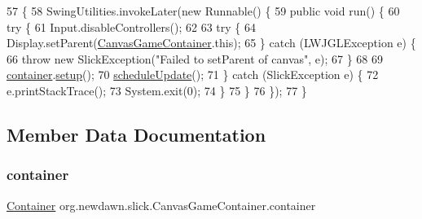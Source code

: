 \begin{DoxyCode}
57                                               \{
58         SwingUtilities.invokeLater(\textcolor{keyword}{new} Runnable() \{
59             \textcolor{keyword}{public} \textcolor{keywordtype}{void} run() \{
60                 \textcolor{keywordflow}{try} \{
61                     Input.disableControllers();
62                     
63                     \textcolor{keywordflow}{try} \{
64                         Display.setParent(\mbox{\hyperlink{classorg_1_1newdawn_1_1slick_1_1_canvas_game_container_a078feee2c69d77cabd1f09b87d055923}{CanvasGameContainer}}.this);
65                     \} \textcolor{keywordflow}{catch} (LWJGLException e) \{
66                         \textcolor{keywordflow}{throw} \textcolor{keyword}{new} SlickException(\textcolor{stringliteral}{"Failed to setParent of canvas"}, e);
67                     \}
68                     
69                     \mbox{\hyperlink{classorg_1_1newdawn_1_1slick_1_1_canvas_game_container_af13c765d7302dc5948d0261e2526ef8b}{container}}.\mbox{\hyperlink{classorg_1_1newdawn_1_1slick_1_1_app_game_container_ac2c97110363892113b435cc8aa5b0d4a}{setup}}();
70                     \mbox{\hyperlink{classorg_1_1newdawn_1_1slick_1_1_canvas_game_container_a38f91f490299ca036d075779ff15ff15}{scheduleUpdate}}();
71                 \} \textcolor{keywordflow}{catch} (SlickException e) \{
72                     e.printStackTrace();
73                     System.exit(0);
74                 \}
75             \}
76         \});
77     \}
\end{DoxyCode}


\subsection{Member Data Documentation}
\mbox{\label{classorg_1_1newdawn_1_1slick_1_1_canvas_game_container_af13c765d7302dc5948d0261e2526ef8b}} 
\subsubsection{\texorpdfstring{container}{container}}
{\footnotesize\ttfamily \mbox{\hyperlink{classorg_1_1newdawn_1_1slick_1_1_canvas_game_container_1_1_container}{Container}} org.\+newdawn.\+slick.\+Canvas\+Game\+Container.\+container\hspace{0.3cm}{\ttfamily [protected]}}

